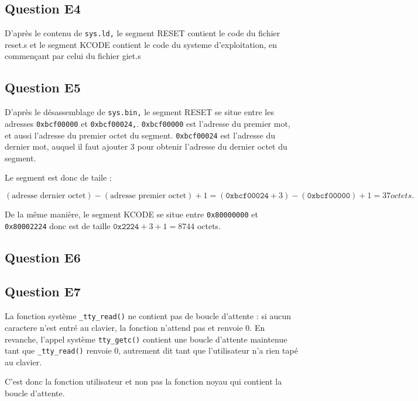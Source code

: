 \documentclass{article}
\begin{document}
\subsection{Question E4}

D'après le contenu de \texttt{sys.ld,} le segment RESET contient le code du fichier
reset.s et le segment KCODE contient le code du systeme d'exploitation,
en commençant par celui du fichier giet.s

\subsection{Question E5}

D'après le désassemblage de \texttt{sys.bin,} le segment RESET se situe entre les
adresses \texttt{0xbcf00000} et \texttt{0xbcf00024,}.
\texttt{0xbcf00000} est l'adresse du premier mot, et aussi l'adresse du premier
octet du segment. \texttt{0xbcf00024} est l'adresse du dernier mot, auquel
il faut ajouter $3$ pour obtenir l'adresse du dernier octet du segment.

Le segment est donc de taile :

$ (\text{adresse dernier octet}) - (\text{adresse premier octet}) + 1
  = (\texttt{0xbcf00024} + 3) - (\texttt{0xbcf00000}) + 1
  = 37 octets. $

De la même manière, le segment KCODE se situe entre \texttt{0x80000000}
et \texttt{0x80002224} donc est de taille $\texttt{0x2224} + 3 + 1 = 8744$ octets.

\subsection{Question E6}



\subsection{Question E7}

La fonction système \texttt{\_tty\_read()} ne contient pas de boucle d'attente :
si aucun caractere n'est entré au clavier, la fonction n'attend pas et
renvoie 0.
En revanche, l'appel système \texttt{tty\_getc()} contient une boucle d'attente
maintenue tant que \texttt{\_tty\_read()} renvoie 0, autrement dit tant que
l'utilisateur n'a rien tapé au clavier.

C'est donc la fonction utilisateur et non pas la fonction noyau qui contient
la boucle d'attente.
\end{document}

